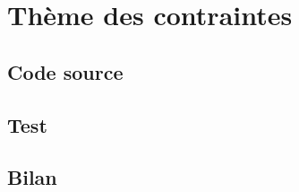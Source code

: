 
\section{Thème des contraintes}

    \subsection{Code source}

        


    \subsection{Test}

    
    \subsection{Bilan}
